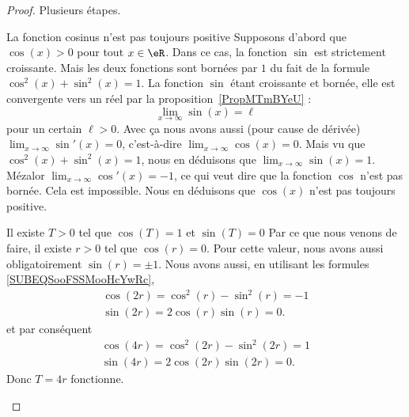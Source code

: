 \begin{proof}
	Plusieurs étapes.
	\begin{subproof}
		\item[La fonction cosinus n'est pas toujours positive]
		Supposons d'abord que \( \cos(x)>0\) pour tout \( x\in \eR\). Dans ce cas, la fonction \( \sin\) est strictement croissante. Mais les deux fonctions sont bornées par \( 1\) du fait de la formule \( \cos^2(x)+\sin^2(x)=1\). La fonction \( \sin\) étant croissante et bornée, elle est convergente vers un réel par la proposition~\ref{PropMTmBYeU} :
		\begin{equation}
			\lim_{x\to \infty} \sin(x)=\ell
		\end{equation}
		pour un certain \( \ell>0\). Avec ça nous avons aussi (pour cause de dérivée) \( \lim_{x\to \infty} \sin'(x)=0\), c'est-à-dire \( \lim_{x\to \infty} \cos(x)=0\). Mais vu que \( \cos^2(x)+\sin^2(x)=1\), nous en déduisons que \( \lim_{x\to \infty} \sin(x)=1\). Mézalor \( \lim_{x\to \infty} \cos'(x)=-1\), ce qui veut dire que la fonction \( \cos\) n'est pas bornée. Cela est impossible. Nous en déduisons que \( \cos(x)\) n'est pas toujours positive.

		\item[Il existe \( T>0\) tel que \( \cos(T)=1\) et \( \sin(T)=0\)]
		Par ce que nous venons de faire, il existe \( r>0\) tel que \( \cos(r)=0\). Pour cette valeur, nous avons aussi obligatoirement \( \sin(r)=\pm 1\). Nous avons aussi, en utilisant les formules \eqref{SUBEQSooFSSMooHcYwRc},
		\begin{subequations}
			\begin{align}
				\cos(2r)=\cos^2(r)-\sin^2(r)=-1 \\
				\sin(2r)=2\cos(r)\sin(r)=0.
			\end{align}
		\end{subequations}
		et par conséquent
		\begin{subequations}
			\begin{align}
				\cos(4r)=\cos^2(2r)-\sin^2(2r)=1 \\
				\sin(4r)=2\cos(2r)\sin(2r)=0.
			\end{align}
		\end{subequations}
		Donc \( T=4r\) fonctionne.


\end{subproof}
\end{proof}
